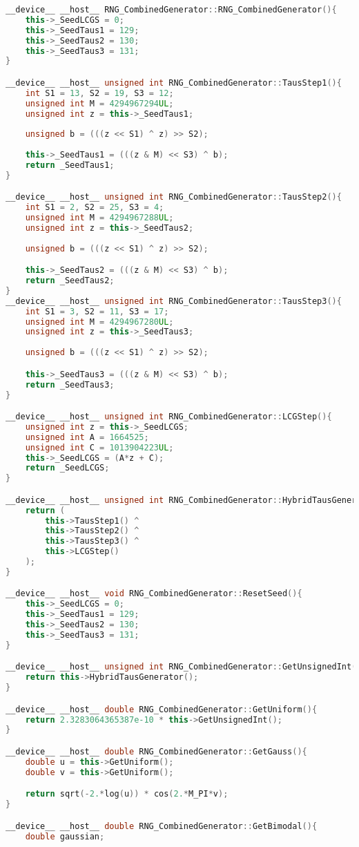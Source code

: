 \begin{lstlisting}[language=C++, caption={\texttt{libraries/CoreLibraries/RandomGenerator/RNG.cu}}]
__device__ __host__ RNG_CombinedGenerator::RNG_CombinedGenerator(){
	this->_SeedLCGS = 0;
	this->_SeedTaus1 = 129;
	this->_SeedTaus2 = 130;
	this->_SeedTaus3 = 131;
}

__device__ __host__ unsigned int RNG_CombinedGenerator::TausStep1(){
	int S1 = 13, S2 = 19, S3 = 12;
	unsigned int M = 4294967294UL;
	unsigned int z = this->_SeedTaus1;
	
	unsigned b = (((z << S1) ^ z) >> S2);
	
	this->_SeedTaus1 = (((z & M) << S3) ^ b);
	return _SeedTaus1;
}

__device__ __host__ unsigned int RNG_CombinedGenerator::TausStep2(){
	int S1 = 2, S2 = 25, S3 = 4;
	unsigned int M = 4294967288UL;
	unsigned int z = this->_SeedTaus2;
	
	unsigned b = (((z << S1) ^ z) >> S2);

	this->_SeedTaus2 = (((z & M) << S3) ^ b);
	return _SeedTaus2;
}
__device__ __host__ unsigned int RNG_CombinedGenerator::TausStep3(){
	int S1 = 3, S2 = 11, S3 = 17;
	unsigned int M = 4294967280UL;
	unsigned int z = this->_SeedTaus3;
	
	unsigned b = (((z << S1) ^ z) >> S2);

	this->_SeedTaus3 = (((z & M) << S3) ^ b);
	return _SeedTaus3;
}

__device__ __host__ unsigned int RNG_CombinedGenerator::LCGStep(){
	unsigned int z = this->_SeedLCGS;
	unsigned int A = 1664525;
	unsigned int C = 1013904223UL;
	this->_SeedLCGS = (A*z + C);
	return _SeedLCGS;
}

__device__ __host__ unsigned int RNG_CombinedGenerator::HybridTausGenerator(){
	return (
		this->TausStep1() ^
		this->TausStep2() ^
		this->TausStep3() ^
		this->LCGStep()
	);
}

__device__ __host__ void RNG_CombinedGenerator::ResetSeed(){
	this->_SeedLCGS = 0;
	this->_SeedTaus1 = 129;
	this->_SeedTaus2 = 130;
	this->_SeedTaus3 = 131;
}

__device__ __host__ unsigned int RNG_CombinedGenerator::GetUnsignedInt(){
	return this->HybridTausGenerator();
}

__device__ __host__ double RNG_CombinedGenerator::GetUniform(){
	return 2.3283064365387e-10 * this->GetUnsignedInt();
}

__device__ __host__ double RNG_CombinedGenerator::GetGauss(){
	double u = this->GetUniform();
	double v = this->GetUniform();

	return sqrt(-2.*log(u)) * cos(2.*M_PI*v);
}

__device__ __host__ double RNG_CombinedGenerator::GetBimodal(){
	double gaussian;


\end{lstlisting}
